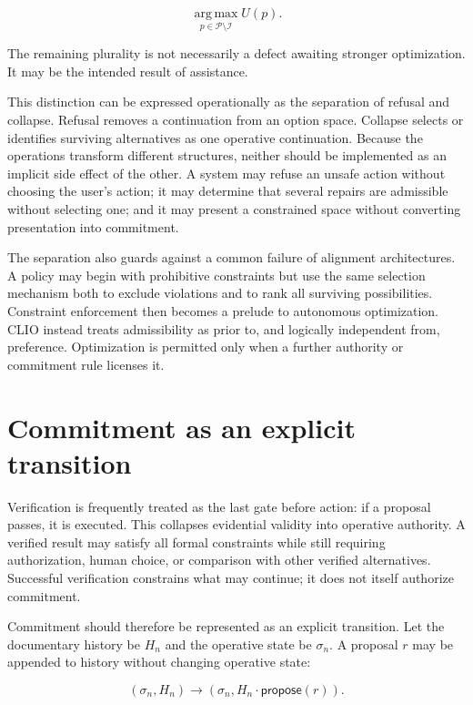 \documentclass[11pt]{article}
\begin{document}
\begin{equation}
\operatorname*{arg\,max}_{p\in\mathcal{P}\setminus\mathcal{I}} U(p).
\end{equation}

The remaining plurality is not necessarily a defect awaiting stronger optimization. It may be the intended result of assistance.

This distinction can be expressed operationally as the separation of refusal and collapse. Refusal removes a continuation from an option space. Collapse selects or identifies surviving alternatives as one operative continuation. Because the operations transform different structures, neither should be implemented as an implicit side effect of the other. A system may refuse an unsafe action without choosing the user's action; it may determine that several repairs are admissible without selecting one; and it may present a constrained space without converting presentation into commitment.

The separation also guards against a common failure of alignment architectures. A policy may begin with prohibitive constraints but use the same selection mechanism both to exclude violations and to rank all surviving possibilities. Constraint enforcement then becomes a prelude to autonomous optimization. CLIO instead treats admissibility as prior to, and logically independent from, preference. Optimization is permitted only when a further authority or commitment rule licenses it.

\section{Commitment as an explicit transition}

Verification is frequently treated as the last gate before action: if a proposal passes, it is executed. This collapses evidential validity into operative authority. A verified result may satisfy all formal constraints while still requiring authorization, human choice, or comparison with other verified alternatives. Successful verification constrains what may continue; it does not itself authorize commitment.

Commitment should therefore be represented as an explicit transition. Let the documentary history be $H_n$ and the operative state be $\sigma_n$. A proposal $r$ may be appended to history without changing operative state:

\begin{equation}
(\sigma_n,H_n) \longrightarrow (\sigma_n,H_n\cdot \mathsf{propose}(r)).
\end{equation}
\end{document}
